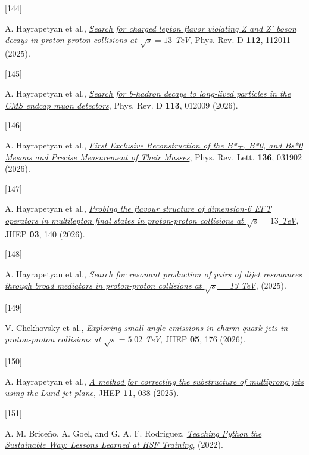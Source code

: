 \documentclass[
]{article}
\newlength{\cslhangindent}
\newlength{\csllabelwidth}
\newenvironment{CSLReferences}[2] %
 {\begin{list}{}{%
  \setlength{\itemindent}{0pt}
  \setlength{\leftmargin}{0pt}
  \setlength{\parsep}{0pt}
  \ifodd #1
   \setlength{\leftmargin}{\cslhangindent}
   \setlength{\itemindent}{-1\cslhangindent}
  \fi
  \setlength{\itemsep}{#2\baselineskip}}}
 {\end{list}}
\newcommand{\CSLLeftMargin}[1]{\parbox[t]{\csllabelwidth}{\strut#1\strut}}
\newcommand{\CSLRightInline}[1]{\parbox[t]{\linewidth - \csllabelwidth}{\strut#1\strut}}
\begin{document}
\begin{CSLReferences}{0}{0}
\CSLLeftMargin{{[}144{]} }%
\CSLRightInline{A. Hayrapetyan et al.,
\emph{\href{https://doi.org/10.1103/8lw4-6lyk}{{Search for charged
lepton flavor violating Z and Z' boson decays in proton-proton
collisions at \(\sqrt{s}=13\) TeV}}}, Phys. Rev. D \textbf{112}, 112011
(2025).}

\CSLLeftMargin{{[}145{]} }%
\CSLRightInline{A. Hayrapetyan et al.,
\emph{\href{https://doi.org/10.1103/7ldn-snzn}{{Search for b-hadron
decays to long-lived particles in the CMS endcap muon detectors}}},
Phys. Rev. D \textbf{113}, 012009 (2026).}

\CSLLeftMargin{{[}146{]} }%
\CSLRightInline{A. Hayrapetyan et al.,
\emph{\href{https://doi.org/10.1103/njf9-4zfv}{{First Exclusive
Reconstruction of the B*+, B*0, and Bs*0 Mesons and Precise Measurement
of Their Masses}}}, Phys. Rev. Lett. \textbf{136}, 031902 (2026).}

\CSLLeftMargin{{[}147{]} }%
\CSLRightInline{A. Hayrapetyan et al.,
\emph{\href{https://doi.org/10.1007/JHEP03(2026)140}{{Probing the
flavour structure of dimension-6 EFT operators in multilepton final
states in proton-proton collisions at \(\sqrt{s}=13\) TeV}}}, JHEP
\textbf{03}, 140 (2026).}

\CSLLeftMargin{{[}148{]} }%
\CSLRightInline{A. Hayrapetyan et al.,
\emph{\href{https://arxiv.org/abs/2507.17884}{{Search for resonant
production of pairs of dijet resonances through broad mediators in
proton-proton collisions at \(\sqrt{s}\) = 13 TeV}}}, (2025).}

\CSLLeftMargin{{[}149{]} }%
\CSLRightInline{V. Chekhovsky et al.,
\emph{\href{https://doi.org/10.1007/JHEP05(2026)176}{{Exploring
small-angle emissions in charm quark jets in proton-proton collisions at
\(\sqrt{s}=5.02\) TeV}}}, JHEP \textbf{05}, 176 (2026).}

\CSLLeftMargin{{[}150{]} }%
\CSLRightInline{A. Hayrapetyan et al.,
\emph{\href{https://doi.org/10.1007/JHEP11(2025)038}{{A method for
correcting the substructure of multiprong jets using the Lund jet
plane}}}, JHEP \textbf{11}, 038 (2025).}

\CSLLeftMargin{{[}151{]} }%
\CSLRightInline{A. M. Briceño, A. Goel, and G. A. F. Rodriguez,
\emph{\href{https://doi.org/10.5281/zenodo.7115834}{Teaching Python the
Sustainable Way: Lessons Learned at HSF Training}}, (2022).}

\end{CSLReferences}
\end{document}
